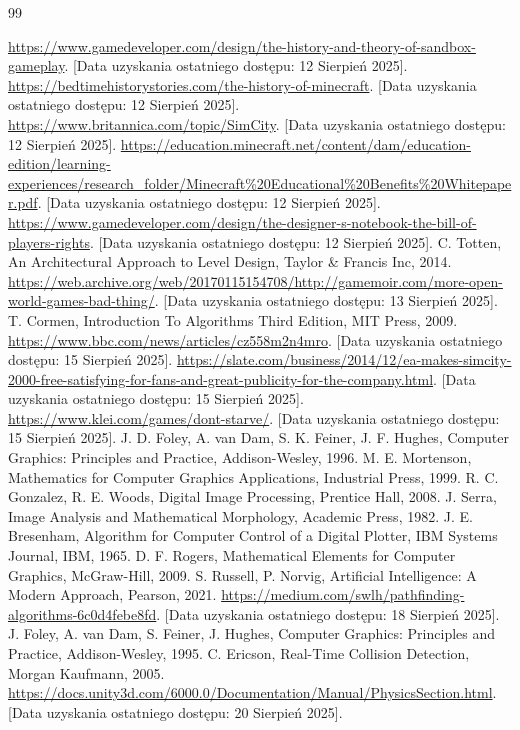 \documentclass[a4paper,12pt]{book} %
\begin{document}
\begin{thebibliography}{99}
  \url{https://www.gamedeveloper.com/design/the-history-and-theory-of-sandbox-gameplay}. [Data uzyskania ostatniego dostępu: 12 Sierpień 2025].
  \url{https://bedtimehistorystories.com/the-history-of-minecraft}. [Data uzyskania ostatniego dostępu: 12 Sierpień 2025].
  \url{https://www.britannica.com/topic/SimCity}. [Data uzyskania ostatniego dostępu: 12 Sierpień 2025].
  \url{https://education.minecraft.net/content/dam/education-edition/learning-experiences/research_folder/Minecraft%20Educational%20Benefits%20Whitepaper.pdf}. [Data uzyskania ostatniego dostępu: 12 Sierpień 2025]. 
  \url{https://www.gamedeveloper.com/design/the-designer-s-notebook-the-bill-of-players-rights}. [Data uzyskania ostatniego dostępu: 12 Sierpień 2025].
  C. Totten, An Architectural Approach to Level Design, Taylor \& Francis Inc, 2014. 
  \url{https://web.archive.org/web/20170115154708/http://gamemoir.com/more-open-world-games-bad-thing/}. [Data uzyskania ostatniego dostępu: 13 Sierpień 2025]. 
  T. Cormen, Introduction To Algorithms Third Edition, MIT Press, 2009. 
  \url{https://www.bbc.com/news/articles/cz558m2n4mro}. [Data uzyskania ostatniego dostępu: 15 Sierpień 2025].
  \url{https://slate.com/business/2014/12/ea-makes-simcity-2000-free-satisfying-for-fans-and-great-publicity-for-the-company.html}. [Data uzyskania ostatniego dostępu: 15 Sierpień 2025].
  \url{https://www.klei.com/games/dont-starve/}. [Data uzyskania ostatniego dostępu: 15 Sierpień 2025].
  J. D. Foley, A. van Dam, S. K. Feiner, J. F. Hughes, 
Computer Graphics: Principles and Practice, Addison-Wesley, 1996.
 M. E. Mortenson, Mathematics for Computer Graphics Applications, Industrial Press, 1999.
 R. C. Gonzalez, R. E. Woods, Digital Image Processing, Prentice Hall, 2008.
 J. Serra, Image Analysis and Mathematical Morphology, Academic Press, 1982.
 J. E. Bresenham, Algorithm for Computer Control of a Digital Plotter, IBM Systems Journal, IBM, 1965.
 D. F. Rogers, Mathematical Elements for Computer Graphics, McGraw-Hill, 2009.
 S. Russell, P. Norvig, Artificial Intelligence: A Modern Approach, Pearson, 2021.
 \url{https://medium.com/swlh/pathfinding-algorithms-6c0d4febe8fd}. [Data uzyskania ostatniego dostępu: 18 Sierpień 2025].
 J. Foley, A. van Dam, S. Feiner, J. Hughes, Computer Graphics: Principles and Practice, Addison-Wesley, 1995.
C. Ericson, Real-Time Collision Detection, Morgan Kaufmann, 2005.
 \url{https://docs.unity3d.com/6000.0/Documentation/Manual/PhysicsSection.html}. [Data uzyskania ostatniego dostępu: 20 Sierpień 2025].


\end{thebibliography}
\end{document}
